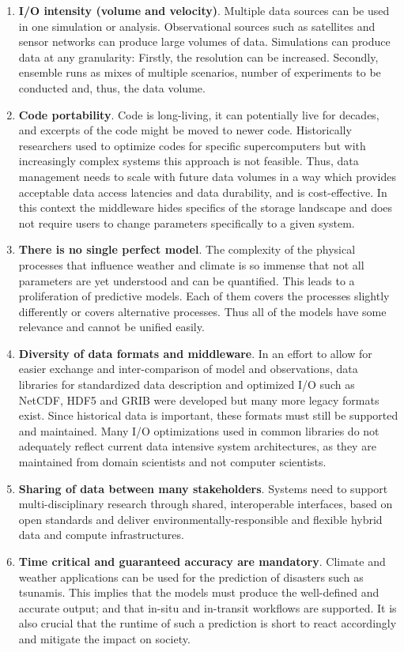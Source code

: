 \documentclass{../../template/esiwace-report}
\begin{document}
\begin{enumerate}
\item \textbf{I/O intensity (volume and velocity)}.
Multiple data sources can be used in one simulation or analysis.
Observational sources such as satellites and sensor networks can produce large volumes of data.
Simulations can produce data at any granularity: Firstly, the resolution can be increased. 
Secondly, ensemble runs as mixes of multiple scenarios, number of experiments to be conducted and, thus, the data volume.


\item \textbf{Code portability}. Code is long-living, it can potentially live for decades, and excerpts of the code might be moved to newer code.
Historically researchers used to optimize codes for specific supercomputers but with increasingly complex systems this approach is not feasible.
Thus, data management needs to scale with future data volumes in a way which provides acceptable data access latencies and data durability, and is cost-effective. 
In this context the middleware hides specifics of the storage landscape and does not require users to change parameters specifically to a given system.


\item \textbf{There is no single perfect model}. 
  The complexity of the physical processes that influence weather and climate is so immense that not all parameters are yet understood and can be quantified. 
  This leads to a proliferation of predictive models. Each of them covers the processes slightly differently or covers alternative processes. 
  Thus all of the models have some relevance and cannot be unified easily.

\item \textbf{Diversity of data formats and middleware}.
In an effort to allow for easier exchange and inter-comparison of model and observations, data libraries for standardized data description and optimized I/O such as NetCDF, HDF5 and GRIB were developed but many more legacy formats exist. Since historical data is important, these formats must still be supported and maintained.
Many I/O optimizations used in common libraries do not adequately reflect current data intensive system architectures, as they are maintained from domain scientists 
and not computer scientists.


\item \textbf{Sharing of data between many stakeholders}.
Systems need to support multi-disciplinary research through shared, interoperable interfaces, based on open standards and deliver environmentally-responsible and flexible hybrid data and compute infrastructures.

\item \textbf{Time critical and guaranteed accuracy are mandatory}. 
Climate and weather applications can be used for the prediction of disasters such as tsunamis.
This implies that the models must produce the well-defined and accurate output; and that in-situ and in-transit workflows are supported.
It is also crucial that the runtime of such a prediction is short to react accordingly and mitigate the impact on society.
\end{enumerate}
\end{document}
